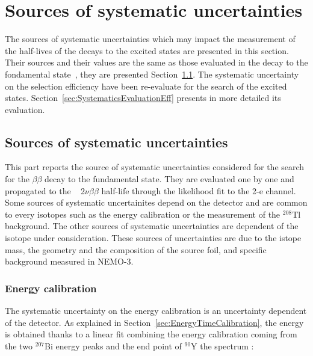 \documentclass[main.tex]{subfiles}
\begin{document}
\FloatBarrier


\section{Sources of systematic uncertainties}\label{sec:SourceOfSystematics}


\NI The sources of systematic uncertainties which may impact the measurement of the half-lives of the decays to the excited states are presented in this section. Their sources and their values are the same as those evaluated in the decay to the fondamental state~\cite{Arnold2016bed}, they are presented Section~\ref{sec:CurrentSystematics}. The systematic uncertainty on  the selection efficiency have been re-evaluate for the search of the excited states. Section~\ref{sec:SystematicsEvaluationEff} presents in more detailed its evaluation. 



\subsection{Sources of systematic uncertainties} \label{sec:CurrentSystematics}


\NI This part reports the source of systematic uncertainties considered for the search for the $\beta\beta$ decay to the fundamental state. They are evaluated one by one and propagated to the \Cd~ 2$\nu\beta\beta$ half-life through the likelihood fit to the 2-e channel. Some sources of systematic uncertainites depend on the detector and are common to every isotopes such as the energy calibration or the measurement of the $^{\text{208}}$Tl background. The other sources of systematic uncertainties are dependent of the isotope under consideration. These sources of uncertainties are due to the istope mass, the geometry and the composition of the source foil, and specific background measured in NEMO-3. 


\subsubsection{Energy calibration}


\NI The systematic uncertainty on the energy calibration is an uncertainty dependent of the detector. As explained in Section~\ref{sec:EnergyTimeCalibration}, the energy is obtained thanks to a linear fit combining the energy calibration coming from the two $^{\text{207}}$Bi energy peaks and the end point of $^{\text{90}}$Y the spectrum :
\end{document}

